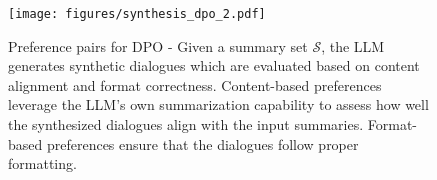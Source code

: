 





\begin{figure}[t]
    \centering
    \texttt{[image: figures/synthesis\_dpo\_2.pdf]}
    \caption{
    Preference pairs for DPO - Given a summary set \( \mathcal{S} \), the LLM generates synthetic dialogues which are evaluated based on content alignment and format correctness. Content-based preferences leverage the LLM's own summarization capability to assess how well the synthesized dialogues align with the input summaries. Format-based preferences ensure that the dialogues follow proper formatting.
    }
    \label{fig:dpo}
\end{figure}




